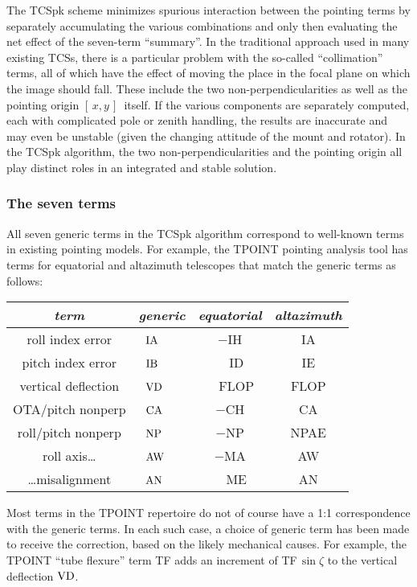 \documentclass[12pt,fleqn,twoside]{article}
\renewcommand{\_}{{\tt\char'137}}     %
\newcommand{\xy}        {$[\,x,y\,]$}
\newcommand{\ia}         {{\rm IA}}
\newcommand{\ib}         {{\rm IB}}
\newcommand{\vd}         {{\rm VD}}
\newcommand{\ca}         {{\rm CA}}
\newcommand{\np}         {{\rm NP}}
\newcommand{\aw}         {{\rm AW}}
\newcommand{\an}         {{\rm AN}}
\newcommand{\iatx}       {$\ia$}
\newcommand{\ibtx}       {$\ib$}
\newcommand{\vdtx}       {$\vd$}
\newcommand{\catx}       {$\ca$}
\newcommand{\nptx}       {$\np$}
\newcommand{\awtx}       {$\aw$}
\newcommand{\antx}       {$\an$}
\begin{document}
The TCSpk scheme minimizes spurious interaction between the pointing
terms by separately accumulating the various combinations and only
then evaluating the net effect of the seven-term ``summary''.  In
the traditional approach used in many
existing TCSs, there is a particular problem with the
so-called ``collimation'' terms, all of which have the effect of
moving the place in the focal plane on which the image should
fall.  These include the two non-perpendicularities as well as
the pointing origin \xy\ itself. If the various components are
separately computed, each with complicated pole or zenith
handling, the results are inaccurate and may even be unstable
(given the changing attitude of the mount and rotator).  In the
TCSpk algorithm, the two non-perpendicularities and the pointing
origin all play distinct roles in an integrated and stable solution.

\subsubsection{The seven terms}
\label{generic}

All seven generic terms in the TCSpk algorithm correspond to
well-known terms in existing pointing models.  For example, the
TPOINT pointing analysis tool has terms for equatorial and
altazimuth telescopes that match the generic terms as follows:

\begin{center}
\begin{tabular}{|c|l||c|c|} \hline
{\it term} & {\it generic} & {\it equatorial} & {\it altazimuth} \\
\hline
roll index error & ~\iatx & $-$IH & IA \\
pitch index error & ~\ibtx & ~~ID & IE \\
vertical deflection & ~\vdtx & ~~FLOP & FLOP \\
OTA/pitch nonperp & ~\catx & $-$CH & CA \\
roll/pitch nonperp & ~\nptx & $-$NP & NPAE \\
roll axis\ldots & ~\awtx & $-$MA & AW \\
\ldots misalignment & ~\antx & ~~ME & AN \\ \hline
\end{tabular}
\end{center}

Most terms in the TPOINT repertoire do not of course have a 1:1
correspondence with the generic terms.  In each such case, a
choice of generic term has been made to receive the correction,
based on the likely mechanical causes.  For example, the TPOINT
``tube flexure'' term TF adds an increment of TF$\,\sin{\zeta}$ to
the vertical deflection \vdtx.
\end{document}
